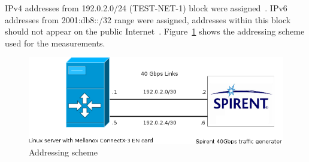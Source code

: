 IPv4 addresses from 192.0.2.0/24 (TEST-NET-1) block were assigned~\cite{rfc5737}.
IPv6 addresses from 2001:db8::/32 range were assigned,
addresses within this block should not appear on the public Internet~\cite{rfc3849}.
Figure~\ref{fig:addressing-scheme} shows the addressing scheme used for the measurements.
\begin{figure}[H]
	\centering
	\includegraphics[width=13.5cm,keepaspectratio]{fig/net-setup.png}
	\caption{Addressing scheme}
	\label{fig:addressing-scheme}
\end{figure}








